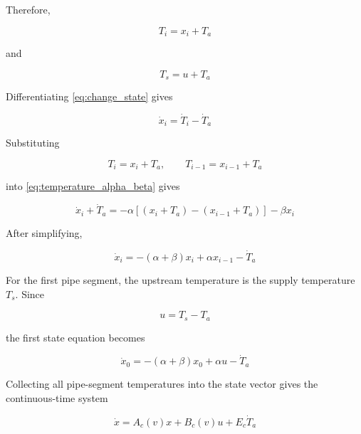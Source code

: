 Therefore,

\begin{equation}
    T_i
    =
    x_i+T_a
\end{equation}

and

\begin{equation}
    T_s
    =
    u+T_a
\end{equation}

Differentiating \cref{eq:change_state} gives

\begin{equation}
    \dot{x}_i
    =
    \dot{T}_i-\dot{T}_a
\end{equation}

Substituting

\begin{equation}
    T_i=x_i+T_a,
    \qquad
    T_{i-1}=x_{i-1}+T_a
\end{equation}

into \cref{eq:temperature_alpha_beta} gives

\begin{equation}
    \dot{x}_i+\dot{T}_a
    =
    -
    \alpha
    \left[
        (x_i+T_a)
        -
        (x_{i-1}+T_a)
    \right]
    -
    \beta x_i
\end{equation}

After simplifying,

\begin{equation}
    \boxed{
    \dot{x}_i
    =
    -
    (\alpha+\beta)x_i
    +
    \alpha x_{i-1}
    -
    \dot{T}_a
    }
    \label{eq:district_heating_xi}
\end{equation}

For the first pipe segment, the upstream temperature is the supply
temperature \(T_s\). Since

\begin{equation}
    u=T_s-T_a
\end{equation}

the first state equation becomes

\begin{equation}
    \boxed{
    \dot{x}_0
    =
    -
    (\alpha+\beta)x_0
    +
    \alpha u
    -
    \dot{T}_a
    }
    \label{eq:district_heating_x0}
\end{equation}

Collecting all pipe-segment temperatures into the state vector gives the
continuous-time system

\begin{equation}
    \boxed{
    \dot{x}
    =
    A_c(v)x
    +
    B_c(v)u
    +
    E_c\dot{T}_a
    }
    \label{eq:district_heating_continuous}
\end{equation}

